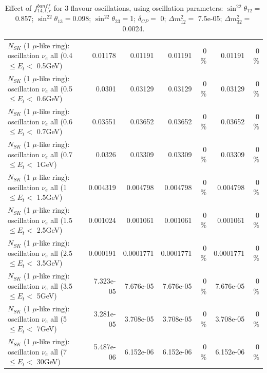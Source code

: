\begin{table}
\begin{tabular}{| l | r | r | r  r | r  r |}
$N_{SK}$ (1 $\mu$-like ring): oscillation $\nu_{e}$ all (0.4 $\leq E_{t} <$ 0.5GeV) &         0.01178 &         0.01191 &         0.01191 &        0 \%  &         0.01191 &        0 \%  \\ 
$N_{SK}$ (1 $\mu$-like ring): oscillation $\nu_{e}$ all (0.5 $\leq E_{t} <$ 0.6GeV) &          0.0301 &         0.03129 &         0.03129 &        0 \%  &         0.03129 &        0 \%  \\ 
$N_{SK}$ (1 $\mu$-like ring): oscillation $\nu_{e}$ all (0.6 $\leq E_{t} <$ 0.7GeV) &         0.03551 &         0.03652 &         0.03652 &        0 \%  &         0.03652 &        0 \%  \\ 
$N_{SK}$ (1 $\mu$-like ring): oscillation $\nu_{e}$ all (0.7 $\leq E_{t} <$ 1GeV) &          0.0326 &         0.03309 &         0.03309 &        0 \%  &         0.03309 &        0 \%  \\ 
$N_{SK}$ (1 $\mu$-like ring): oscillation $\nu_{e}$ all (1 $\leq E_{t} <$ 1.5GeV) &        0.004319 &        0.004798 &        0.004798 &        0 \%  &        0.004798 &        0 \%  \\ 
$N_{SK}$ (1 $\mu$-like ring): oscillation $\nu_{e}$ all (1.5 $\leq E_{t} <$ 2.5GeV) &        0.001024 &        0.001061 &        0.001061 &        0 \%  &        0.001061 &        0 \%  \\ 
$N_{SK}$ (1 $\mu$-like ring): oscillation $\nu_{e}$ all (2.5 $\leq E_{t} <$ 3.5GeV) &        0.000191 &       0.0001771 &       0.0001771 &        0 \%  &       0.0001771 &        0 \%  \\ 
$N_{SK}$ (1 $\mu$-like ring): oscillation $\nu_{e}$ all (3.5 $\leq E_{t} <$ 5GeV) &       7.323e-05 &       7.676e-05 &       7.676e-05 &        0 \%  &       7.676e-05 &        0 \%  \\ 
 $N_{SK}$ (1 $\mu$-like ring): oscillation $\nu_{e}$ all (5 $\leq E_{t} <$ 7GeV) &       3.281e-05 &       3.708e-05 &       3.708e-05 &        0 \%  &       3.708e-05 &        0 \%  \\ 
$N_{SK}$ (1 $\mu$-like ring): oscillation $\nu_{e}$ all (7 $\leq E_{t} <$ 30GeV) &       5.487e-06 &       6.152e-06 &       6.152e-06 &        0 \%  &       6.152e-06 &        0 \%  \\ 
\hline
\hline
\end{tabular}
\caption{ Effect of $f_{14; t, r}^{banff}$ for 3 flavour oscillations, using oscillation parameters:  $\sin^22\theta_{12} = $0.857; $\sin^22\theta_{13} = $0.098; $\sin^22\theta_{23} = $1; $\delta_{CP} = $        0; $\Delta m^2_{12} = $    7.5e-05; $\Delta m^2_{32} = $    0.0024. }
\label{tab:num_banff_14_1RmuT_3f_osc_t13:0.098}
\end{table}
